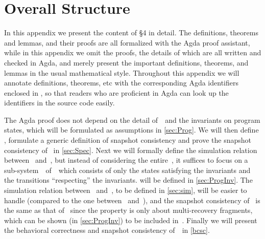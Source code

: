 
\section{Overall Structure}


In this appendix we present the content of \S4 in detail. The definitions, theorems and lemmas, and their proofs are all formalized with the Agda proof assistant, while in this appendix we omit the proofs, the details of which are all written and checked in Agda, and merely present the important definitions, theorems, and lemmas in the usual mathematical style.
Throughout this appendix we will annotate definitions, theorems, etc with the corresponding Agda identifiers enclosed in \AgdaId{\cdot}, so that readers who are proficient in Agda can look up the identifiers in the source code easily.

The Agda proof does not depend on the detail of~\Prog\ and the invariants on program states, which will be formulated as assumptions in \cref{sec:Prog}.
We will then define \Spec, formulate a generic definition of snapshot consistency and prove the snapshot consistency of \Spec\ in \cref{sec:Spec}.
Next we will formally define the simulation relation between \Prog~and~\Spec, but instead of considering the entire~\Prog, it suffices to focus on a sub-system~\ProgInv\ of~\Prog\ which consists of only the states satisfying the invariants and the transitions ``respecting'' the invariants. \ProgInv will be defined in \cref{sec:ProgInv}.
The simulation relation between \ProgInv~and~\Spec, to be defined in \cref{sec:sim}, will be easier to handle (compared to the one between \Prog~and~\Spec), and the snapshot consistency of \ProgInv\ is the same as that of \Prog\ since the property is only about multi-recovery fragments, which can be shown (in \cref{sec:ProgInv}) to be included in~\ProgInv.
Finally we will present the behavioral correctness and snapshot consistency of~\ProgInv\ in \cref{bcsc}.
